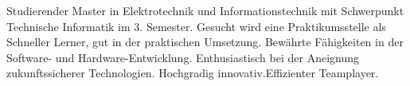 

\begin{cvparagraph}

Studierender Master in Elektrotechnik und Informationstechnik mit Schwerpunkt Technische Informatik im 3. Semester. Gesucht wird eine Praktikumsstelle als
Schneller Lerner, gut in der praktischen Umsetzung. Bewährte Fähigkeiten in der Software- und Hardware-Entwicklung. Enthusiastisch bei der Aneignung zukunftssicherer Technologien. Hochgradig innovativ.Effizienter Teamplayer.
\end{cvparagraph}
